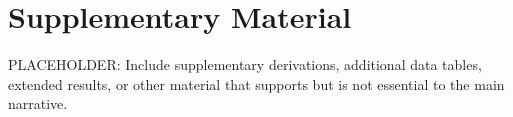 \documentclass{nrlreport} %
\begin{document}




\appendix

\chapter{Supplementary Material}
\label{app:supplementary}

\begin{bibunit}

PLACEHOLDER: Include supplementary derivations, additional data tables,
extended results, or other material that supports but is not essential
to the main narrative.


\end{bibunit}


%
%
\end{document}

